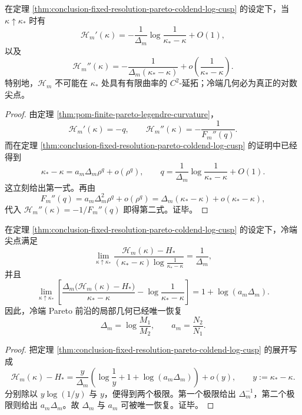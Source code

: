 \begin{corollary}[冷端有限曲率延拓不可能与二阶极点律]\label{cor:conclusion-pareto-coldend-curvature-pole}
在定理 \ref{thm:conclusion-fixed-resolution-pareto-coldend-log-cusp} 的设定下，当 \(\kappa\uparrow\kappa_\ast\) 时有
\[
\mathcal H_m'(\kappa)
=
-\frac1{\Delta_m}\log\frac1{\kappa_\ast-\kappa}
+O(1),
\]
以及
\[
\mathcal H_m''(\kappa)
=
-\frac{1}{\Delta_m(\kappa_\ast-\kappa)}
+o\!\left(\frac1{\kappa_\ast-\kappa}\right).
\]
特别地，\(\mathcal H_m\) 不可能在 \(\kappa_\ast\) 处具有有限曲率的 \(C^2\)-延拓；冷端几何必为真正的对数尖点。
\end{corollary}
\begin{proof}
由定理 \ref{thm:pom-finite-pareto-legendre-curvature}，
\[
\mathcal H_m'(\kappa)=-q,
\qquad
\mathcal H_m''(\kappa)=-\frac1{F_m''(q)}.
\]
而在定理 \ref{thm:conclusion-fixed-resolution-pareto-coldend-log-cusp} 的证明中已经得到
\[
\kappa_\ast-\kappa=a_m\Delta_m\rho^q+o(\rho^q),
\qquad
q=
\frac1{\Delta_m}\log\frac1{\kappa_\ast-\kappa}
+O(1).
\]
这立刻给出第一式。再由
\[
F_m''(q)=a_m\Delta_m^2\rho^q+o(\rho^q)
=
\Delta_m(\kappa_\ast-\kappa)+o(\kappa_\ast-\kappa),
\]
代入 \(\mathcal H_m''(\kappa)=-1/F_m''(q)\) 即得第二式。证毕。
\end{proof}

\begin{theorem}[冷端尖点对顶端第二层参数的层析]\label{thm:conclusion-pareto-coldend-two-parameter-tomography}
在定理 \ref{thm:conclusion-fixed-resolution-pareto-coldend-log-cusp} 的设定下，冷端尖点满足
\[
\lim_{\kappa\uparrow\kappa_\ast}
\frac{\mathcal H_m(\kappa)-H_\ast}
{(\kappa_\ast-\kappa)\log\frac1{\kappa_\ast-\kappa}}
=
\frac1{\Delta_m},
\]
并且
\[
\lim_{\kappa\uparrow\kappa_\ast}
\left[
\frac{\Delta_m\bigl(\mathcal H_m(\kappa)-H_\ast\bigr)}{\kappa_\ast-\kappa}
-
\log\frac1{\kappa_\ast-\kappa}
\right]
=
1+\log(a_m\Delta_m).
\]
因此，冷端 Pareto 前沿的局部几何已经唯一恢复
\[
\Delta_m=\log\frac{M_1}{M_2},
\qquad
a_m=\frac{N_2}{N_1}.
\]
\end{theorem}
\begin{proof}
把定理 \ref{thm:conclusion-fixed-resolution-pareto-coldend-log-cusp} 的展开写成
\[
\mathcal H_m(\kappa)-H_\ast
=
\frac{y}{\Delta_m}
\left(
\log\frac1y+1+\log(a_m\Delta_m)
\right)
+o(y),
\qquad
y:=\kappa_\ast-\kappa.
\]
分别除以 \(y\log(1/y)\) 与 \(y\)，便得到两个极限。第一个极限给出 \(\Delta_m^{-1}\)，第二个极限则给出 \(a_m\Delta_m\)。故 \(\Delta_m\) 与 \(a_m\) 可被唯一恢复。证毕。
\end{proof}

